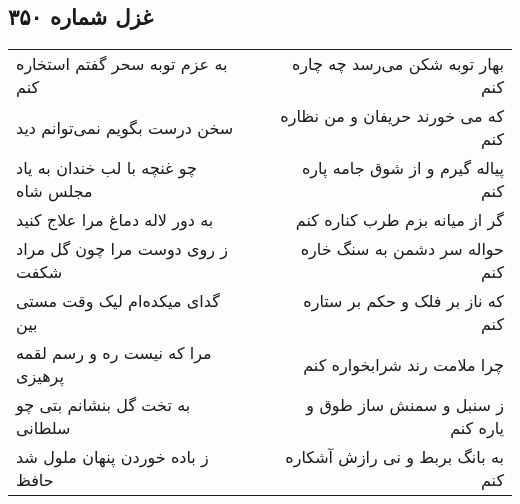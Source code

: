 \begin{center}
\section*{غزل شماره ۳۵۰}
\label{sec:sh350}
\begin{longtable}{l p{0.5cm} r}
به عزم توبه سحر گفتم استخاره کنم
&&
بهار توبه شکن می‌رسد چه چاره کنم
\\
سخن درست بگویم نمی‌توانم دید
&&
که می خورند حریفان و من نظاره کنم
\\
چو غنچه با لب خندان به یاد مجلس شاه
&&
پیاله گیرم و از شوق جامه پاره کنم
\\
به دور لاله دماغ مرا علاج کنید
&&
گر از میانه بزم طرب کناره کنم
\\
ز روی دوست مرا چون گل مراد شکفت
&&
حواله سر دشمن به سنگ خاره کنم
\\
گدای میکده‌ام لیک وقت مستی بین
&&
که ناز بر فلک و حکم بر ستاره کنم
\\
مرا که نیست ره و رسم لقمه پرهیزی
&&
چرا ملامت رند شرابخواره کنم
\\
به تخت گل بنشانم بتی چو سلطانی
&&
ز سنبل و سمنش ساز طوق و یاره کنم
\\
ز باده خوردن پنهان ملول شد حافظ
&&
به بانگ بربط و نی رازش آشکاره کنم
\\
\end{longtable}
\end{center}
